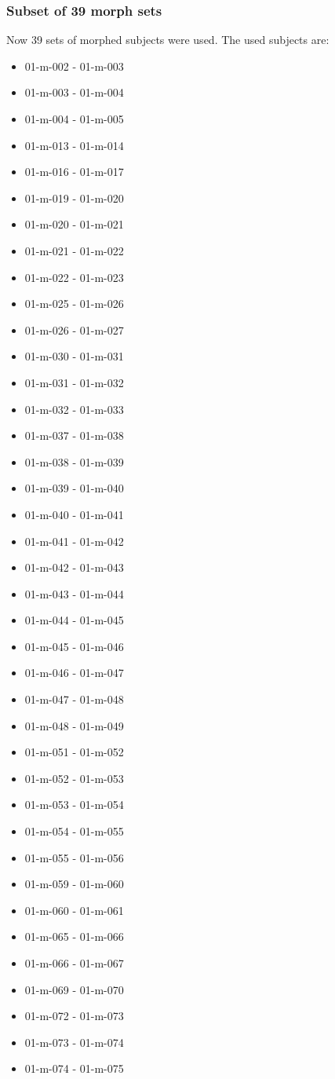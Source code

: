 \subsubsection{Subset of 39 morph sets}\label{sec:subset39}
Now 39 sets of morphed subjects were used. The used subjects are:
\begin{multicols}{3}
\begin{itemize}
\item 01-m-002 - 01-m-003
\item 01-m-003 - 01-m-004
\item 01-m-004 - 01-m-005
\item 01-m-013 - 01-m-014
\item 01-m-016 - 01-m-017
\item 01-m-019 - 01-m-020
\item 01-m-020 - 01-m-021
\item 01-m-021 - 01-m-022
\item 01-m-022 - 01-m-023
\item 01-m-025 - 01-m-026
\item 01-m-026 - 01-m-027
\item 01-m-030 - 01-m-031
\item 01-m-031 - 01-m-032
\item 01-m-032 - 01-m-033
\item 01-m-037 - 01-m-038
\item 01-m-038 - 01-m-039
\item 01-m-039 - 01-m-040
\item 01-m-040 - 01-m-041
\item 01-m-041 - 01-m-042
\item 01-m-042 - 01-m-043
\item 01-m-043 - 01-m-044
\item 01-m-044 - 01-m-045
\item 01-m-045 - 01-m-046
\item 01-m-046 - 01-m-047
\item 01-m-047 - 01-m-048
\item 01-m-048 - 01-m-049
\item 01-m-051 - 01-m-052
\item 01-m-052 - 01-m-053
\item 01-m-053 - 01-m-054
\item 01-m-054 - 01-m-055
\item 01-m-055 - 01-m-056
\item 01-m-059 - 01-m-060
\item 01-m-060 - 01-m-061
\item 01-m-065 - 01-m-066
\item 01-m-066 - 01-m-067
\item 01-m-069 - 01-m-070
\item 01-m-072 - 01-m-073
\item 01-m-073 - 01-m-074
\item 01-m-074 - 01-m-075
\end{itemize}
\end{multicols}



